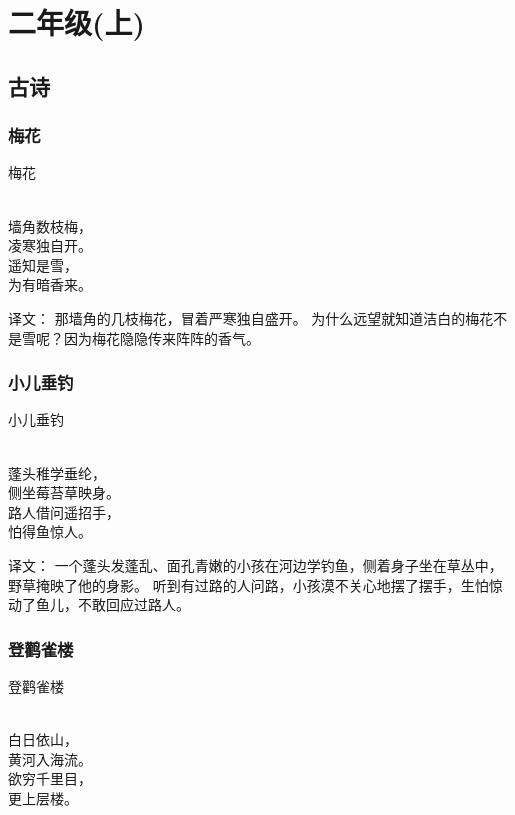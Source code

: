 \chapter{二年级(上)}
\section{古诗}
\subsection{梅花}
\begin{pinyinscope}
	\noindent \huge 梅花
	
	  \\
	
	\noindent 墙角数枝梅，\\凌寒独自开。\\
	遥知是雪，\\为有暗香来。
\end{pinyinscope}

译文：
那墙角的几枝梅花，冒着严寒独自盛开。
为什么远望就知道洁白的梅花不是雪呢？因为梅花隐隐传来阵阵的香气。

\subsection{小儿垂钓}
\begin{pinyinscope}
	\noindent \huge 小儿垂钓
	
	  \\
	
	\noindent 蓬头稚学垂纶，\\侧坐莓苔草映身。\\
	路人借问遥招手，\\怕得鱼惊人。
\end{pinyinscope}

译文：
一个蓬头发蓬乱、面孔青嫩的小孩在河边学钓鱼，侧着身子坐在草丛中，野草掩映了他的身影。
听到有过路的人问路，小孩漠不关心地摆了摆手，生怕惊动了鱼儿，不敢回应过路人。

\subsection{登鹳雀楼}
\begin{pinyinscope}
\noindent \huge 登鹳雀楼

  \\

\noindent 白日依山，\\黄河入海流。\\
欲穷千里目，\\更上层楼。
\end{pinyinscope}

